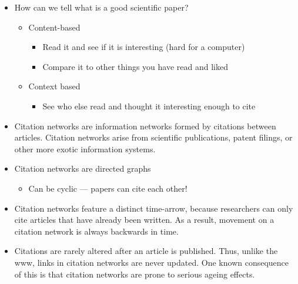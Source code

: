 \documentclass[a4paper,landscape,headrule,footrule,xetex]{foils}
\begin{document}
\begin{itemize}
\item How can we tell what is a good scientific paper?
  \begin{itemize}
    \item Content-based
    \begin{itemize}
    \item Read it and see if it is interesting (hard for a computer)
    \item Compare it to other things you have read and liked
    \end{itemize}
  \item     Context based 
    \begin{itemize}
    \item See who else read and thought it interesting enough to cite
    \end{itemize}
  \end{itemize}
\end{itemize}

\begin{itemize}
\item Citation networks are information networks formed by citations
  between articles. Citation networks arise from scientific
  publications, patent filings, or other more exotic information
  systems.
\item Citation networks are directed graphs
  \begin{itemize}
  \item Can be cyclic --- papers can cite each other!
  \end{itemize}

\item Citation networks feature a distinct time-arrow, because researchers can only cite articles that have already been written. As a result, movement on a citation network is always backwards in time.

\item Citations are rarely altered after an article is published. Thus, unlike the www, links in citation networks are never updated. One known consequence of this is that citation networks are prone to serious ageing effects.
\end{itemize}

\end{document}
